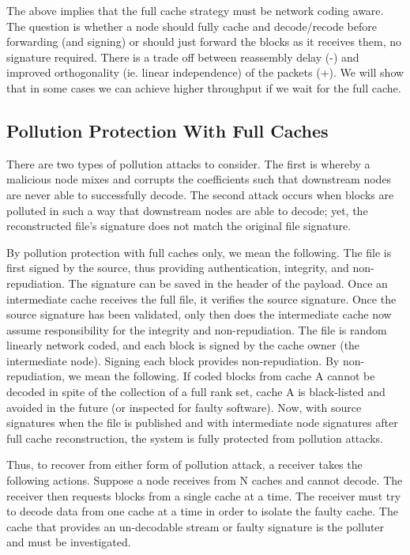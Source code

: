 The above implies that  the full cache strategy must be network coding aware. The question is whether a node should fully cache and decode/recode before forwarding (and signing) or should just forward the blocks as it receives them, no signature required.  There is a trade off between reassembly delay (-) and improved orthogonality (ie. linear independence) of the packets (+). We will show that in some cases we  can achieve higher throughput if we wait for the full cache. 

\subsection{Pollution Protection With Full Caches}
There are two types of pollution attacks to consider. The first is whereby a malicious node mixes and corrupts the coefficients such that downstream nodes are never able to successfully decode. The second attack occurs when blocks are polluted in such a way that downstream nodes are able to decode; yet, the reconstructed file's signature does not match the original file signature.

By pollution protection with full caches only, we mean the following. The file is first signed by the source, thus providing authentication, integrity, and non-repudiation. The signature can be saved in the header of the payload. Once an intermediate cache receives the full file, it verifies the source signature. Once the source signature has been validated, only then does the intermediate cache now assume responsibility for the integrity and non-repudiation. The file is random linearly network coded, and each block is signed by the cache owner (the intermediate node). Signing each block provides non-repudiation. By non-repudiation, we mean the following. If coded blocks from cache A cannot be decoded in spite of the collection of a full rank set, cache A is black-listed and avoided in the future (or inspected for faulty software). Now, with source signatures when the file is published and with intermediate node signatures after full cache reconstruction, the system is fully protected from pollution attacks.

Thus, to recover from either form of pollution attack, a receiver takes the following actions. Suppose a node receives from N caches and cannot decode. The receiver then requests blocks from a single cache at a time. The receiver must try to decode data from one cache at a time in order to isolate the faulty cache. The cache that provides an un-decodable stream or faulty signature  is the polluter and must be investigated. 



